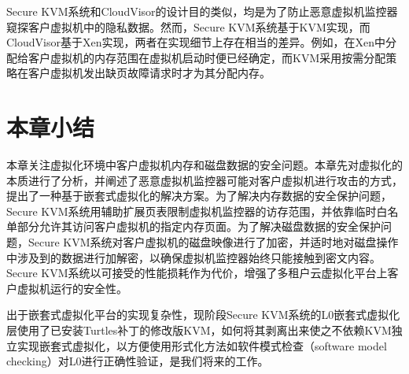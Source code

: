 Secure KVM系统和CloudVisor的设计目的类似，均是为了防止恶意虚拟机监控器窥探客户虚拟机中的隐私数据。然而，Secure KVM系统基于KVM实现，而CloudVisor基于Xen实现，两者在实现细节上存在相当的差异。例如，在Xen中分配给客户虚拟机的内存范围在虚拟机启动时便已经确定，而KVM采用按需分配策略在客户虚拟机发出缺页故障请求时才为其分配内存。

\section{本章小结}

本章关注虚拟化环境中客户虚拟机内存和磁盘数据的安全问题。本章先对虚拟化的本质进行了分析，并阐述了恶意虚拟机监控器可能对客户虚拟机进行攻击的方式，提出了一种基于嵌套式虚拟化的解决方案。为了解决内存数据的安全保护问题，Secure KVM系统用辅助扩展页表限制虚拟机监控器的访存范围，并依靠临时白名单部分允许其访问客户虚拟机的指定内存页面。为了解决磁盘数据的安全保护问题，Secure KVM系统对客户虚拟机的磁盘映像进行了加密，并适时地对磁盘操作中涉及到的数据进行加解密，以确保虚拟机监控器始终只能接触到密文内容。Secure KVM系统以可接受的性能损耗作为代价，增强了多租户云虚拟化平台上客户虚拟机运行的安全性。

出于嵌套式虚拟化平台的实现复杂性，现阶段Secure KVM系统的L0嵌套式虚拟化层使用了已安装Turtles补丁的修改版KVM，如何将其剥离出来使之不依赖KVM独立实现嵌套式虚拟化，以方便使用形式化方法如软件模式检查（software model checking）对L0进行正确性验证，是我们将来的工作。
